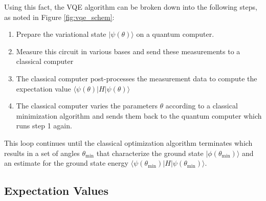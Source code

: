 \documentclass[Dual]{msu-thesis}
\begin{document}
Using this fact, the VQE algorithm can be broken down into the following steps, as noted in Figure \ref{fig:vqe_schem}:
\begin{enumerate}
    \item Prepare the variational state $|\psi(\theta)\rangle$ on a quantum computer.
    \item Measure this circuit in various bases and send these measurements to a classical computer
    \item The classical computer post-processes the measurement data to compute the expectation value $\langle\psi(\theta)|H|\psi(\theta)\rangle$
    \item The classical computer varies the parameters $\theta$ according to a classical minimization algorithm and sends them back to the quantum computer which runs step 1 again.
\end{enumerate}
This loop continues until the classical optimization algorithm terminates which results in a set of angles $\theta_{\text{min}}$ that characterize the ground state $|\phi(\theta_{\text{min}})\rangle$ and an estimate for the ground state energy $\langle\psi(\theta_{\text{min}})|H|\psi(\theta_{\text{min}})\rangle$.

\subsection{Expectation Values}
\label{expectation_values}
\end{document}
